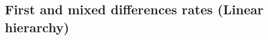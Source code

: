 \documentclass[11pt]{article}
\begin{document}
%
%
%	
%
%
%
%
%	
%	
%	
%



\subsection{First and mixed differences rates (Linear hierarchy)}\label{sec:First and mixed differences rates,(Linear hierarchy)}
\end{document}
